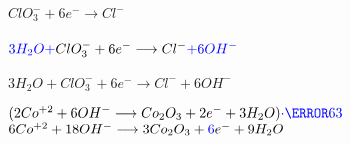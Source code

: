 \documentclass[../Práctica.root.tex]{subfiles}
\newcommand{\lra}{\ensuremath{\longrightarrow{}}}
\begin{document}
\begin{enumerate}
\begin{enumerate}
\begin{itemize}
\begin{multicols}{2}
                                  \columnbreak

                                  $ClO_3^- + 6 e^- \lra Cl^-$ \\
                                   \\
                                  $\blue{3 H_2O +} ClO_3^- + 6 e^- \lra Cl^- \blue{+ 6 OH^-}$\\
                                   \\
                                  $3 H_2O + ClO_3^- + 6 e^- \lra Cl^- + 6 OH^-$\\
                              \end{multicols}
                              \begin{multicols}{2}
                                  $(2 Co^{+2} + 6 OH^- \lra Co_2O_3 + 2 e^- + 3 H_2O)\blue{\cdot\cancel{6}{3}}$ \\
                                  $6 Co^{+2} + 18 OH^- \lra 3 Co_2O_3 + \blue{6} e^- + 9 H_2O$

                                  \columnbreak


\end{multicols}
\end{itemize}
\end{enumerate}
\end{enumerate}
\end{document}
